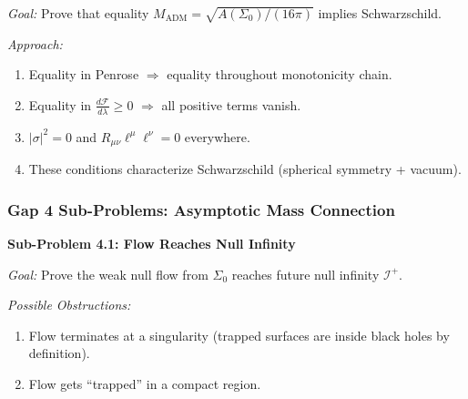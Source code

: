 \textit{Goal:} Prove that equality $M_{\mathrm{ADM}} = \sqrt{A(\Sigma_0)/(16\pi)}$ implies Schwarzschild.

\textit{Approach:}
\begin{enumerate}
    \item Equality in Penrose $\Rightarrow$ equality throughout monotonicity chain.
    \item Equality in $\frac{d\mathcal{F}}{d\lambda} \geq 0$ $\Rightarrow$ all positive terms vanish.
    \item $|\sigma|^2 = 0$ and $R_{\mu\nu}\ell^\mu\ell^\nu = 0$ everywhere.
    \item These conditions characterize Schwarzschild (spherical symmetry + vacuum).
\end{enumerate}

\subsubsection{Gap 4 Sub-Problems: Asymptotic Mass Connection}

\begin{center}
\end{center}

\textbf{Sub-Problem 4.1: Flow Reaches Null Infinity}

\textit{Goal:} Prove the weak null flow from $\Sigma_0$ reaches future null infinity $\mathscr{I}^+$.

\textit{Possible Obstructions:}
\begin{enumerate}
    \item Flow terminates at a singularity (trapped surfaces are inside black holes by definition).
    \item Flow gets ``trapped'' in a compact region.
\end{enumerate}

